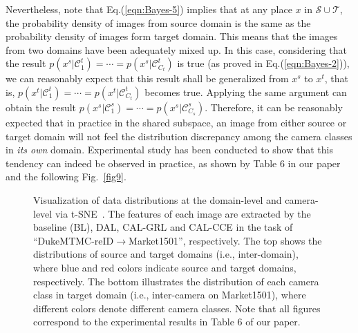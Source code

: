 \documentclass[10pt,twocolumn,letterpaper]{article}
\begin{document}
Nevertheless, note that Eq.(\ref{eqn:Bayes-5}) implies that at any place $x$ in ${\mathcal S}\cup{\mathcal T}$, the probability density of images from source domain is the same as the probability density of images form target domain. This means that the images from two domains have been adequately mixed up. In this case, considering that the result $p(x^s|\mathcal{C}^t_1)=\cdots=p(x^s|\mathcal{C}^t_{C_t})$ is true (as proved in Eq.(\ref{eqn:Bayes-2})), we can reasonably expect that this result shall be generalized from $x^s$ to $x^t$, that is, $p(x^t|\mathcal{C}^t_1)=\cdots=p(x^t|\mathcal{C}^t_{C_t})$ becomes true. Applying the same argument can obtain the result $p(x^s|\mathcal{C}^s_1)=\cdots=p(x^s|\mathcal{C}^s_{C_s})$. Therefore, it can be reasonably expected that in practice in the shared subspace, an image from either source or target domain will not feel the distribution discrepancy among the camera classes in \textit{its own} domain. Experimental study has been conducted to show that this tendency can indeed be observed in practice, as shown by Table 6 in our paper and the following Fig.~\ref{fig9}.
 










\begin{figure*}[htb]
\renewcommand\thefigure{A1}
\centering
{}
\caption{Visualization of data distributions at the domain-level and camera-level via t-SNE~\cite{maaten2008visualizing}. The features of each image are extracted by the baseline (BL), DAL, CAL-GRL and CAL-CCE in the task of ``DukeMTMC-reID$\rightarrow$Market1501'', respectively.  The top shows the distributions of source and target domains (i.e., inter-domain), where blue and red colors indicate source and target domains, respectively. The bottom illustrates the distribution of each camera class in target domain (i.e., inter-camera on Market1501), where different colors denote different camera classes. Note that all figures correspond to the experimental results in Table 6 of our paper.}
\label{fig19}
\end{figure*}
\end{document}
